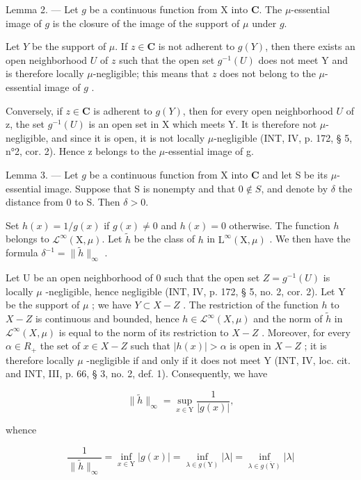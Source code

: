Lemma 2. --- Let \(g\) be a continuous function from X into \(\mathbf{C}\). The \(\mu\)-essential image of \(g\) is the closure of the image of the support of \(\mu\) under \(g\).

Let \(Y\) be the support of \(\mu\). If \(z \in \mathbf{C}\) is not adherent to \(g(Y)\), then there exists an open neighborhood \(U\) of \(z\) such that the open set \(g^{-1}(U)\) does not meet Y and is therefore locally \(\mu\)-negligible; this means that \(z\) does not belong to the \(\mu\)-essential image of \(g\) .

Conversely, if \(z \in \mathbf{C}\) is adherent to \(g(Y)\), then for every open neighborhood \(U\) of z, the set \(g^{-1}(U)\) is an open set in X which meets Y. It is therefore not \(\mu\)-negligible, and since it is open, it is not locally \(\mu\)-negligible (INT, IV, p. 172, § 5, n°2, cor. 2). Hence z belongs to the \(\mu\)-essential image of g.

Lemma 3. --- Let \(g\) be a continuous function from X into \(\mathbf{C}\) and let S be its \(\mu\)-essential image. Suppose that S is nonempty and that \(0 \notin S\), and denote by \(\delta\) the distance from 0 to S. Then \(\delta > 0\).

Set \(h(x) = 1 / g(x)\) if \(g(x) \neq 0\) and \(h(x) = 0\) otherwise. The function \(h\) belongs to \(\mathcal{L}^{\infty}(\mathrm{X},\mu)\). Let \(\widetilde{h}\) be the class of \(h\) in \(\mathrm{L}^{\infty}(\mathrm{X},\mu)\) . We then have the formula \(\delta^{-1} = \| \widetilde{h}\|_{\infty}\) .

Let U be an open neighborhood of 0 such that the open set \(Z = g^{-1}(U)\) is locally \(\mu\) -negligible, hence negligible (INT, IV, p. 172, § 5, no. 2, cor. 2). Let Y be the support of \(\mu\) ; we have \(Y \subset X - Z\) . The restriction of the function \(h\) to \(X - Z\) is continuous and bounded, hence \(h \in \mathcal{L}^{\infty}(X, \mu)\) and the norm of \(\widetilde{h}\) in \(\mathcal{L}^{\infty}(X, \mu)\) is equal to the norm of its restriction to \(X - Z\) . Moreover, for every \(\alpha \in R_{+}\) the set of \(x \in X - Z\) such that \(|h(x)| > \alpha\) is open in \(X - Z\) ; it is therefore locally \(\mu\) -negligible if and only if it does not meet Y (INT, IV, loc. cit. and INT, III, p. 66, § 3, no. 2, def. 1). Consequently, we have

\[
\| \widetilde {h} \| _ {\infty} = \sup _ {x \in \mathrm{Y}} \frac {1}{| g (x) |},
\]

whence

\[
\frac {1}{\| \widetilde {h} \| _ {\infty}} = \inf _ {x \in \mathrm{Y}} | g (x) | = \inf _ {\lambda \in g (\mathrm{Y})} | \lambda | = \inf _ {\lambda \in \overline {{g (\mathrm{Y})}}} | \lambda |
\]

